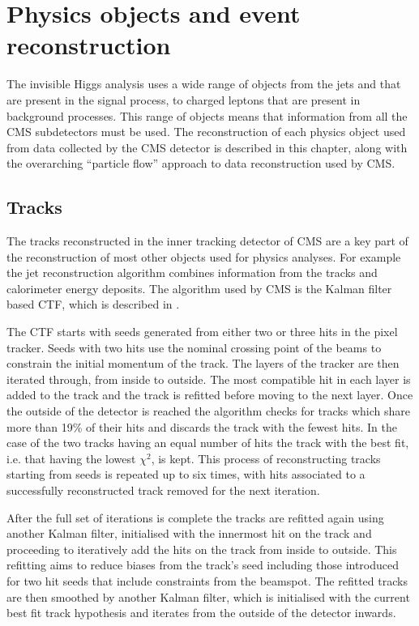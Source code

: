 \chapter{Physics objects and event reconstruction}
\label{chap:obj}
The invisible Higgs analysis uses a wide range of objects from the jets and \MET that are present in the signal process, to charged leptons that are present in background processes. This range of objects means that information from all the CMS subdetectors must be used. The reconstruction of each physics object used from data collected by the CMS detector is described in this chapter, along with the overarching ``particle flow'' approach to data reconstruction used by CMS.

\section{Tracks}
\label{sec:tracks}
The tracks reconstructed in the inner tracking detector of CMS are a key part of the reconstruction of most other objects used for physics analyses. For example the jet reconstruction algorithm combines information from the tracks and calorimeter energy deposits. The algorithm used by CMS is the Kalman filter based \ac{CTF}, which is described in . 

The \ac{CTF} starts with seeds generated from either two or three hits in the pixel tracker. Seeds with two hits use the nominal crossing point of the beams to constrain the initial momentum of the track. The layers of the tracker are then iterated through, from inside to outside. The most compatible hit in each layer is added to the track and the track is refitted before moving to the next layer. Once the outside of the detector is reached the algorithm checks for tracks which share more than 19\% of their hits and discards the track with the fewest hits. In the case of the two tracks having an equal number of hits the track with the best fit, i.e. that having the lowest $\chi^{2}$, is kept. This process of reconstructing tracks starting from seeds is repeated up to six times, with hits associated to a successfully reconstructed track removed for the next iteration. 

After the full set of iterations is complete the tracks are refitted again using another Kalman filter, initialised with the innermost hit on the track and proceeding to iteratively add the hits on the track from inside to outside. This refitting aims to reduce biases from the track's seed including those introduced for two hit seeds that include constraints from the beamspot. The refitted tracks are then smoothed by another Kalman filter, which is initialised with the current best fit track hypothesis and iterates from the outside of the detector inwards. 

